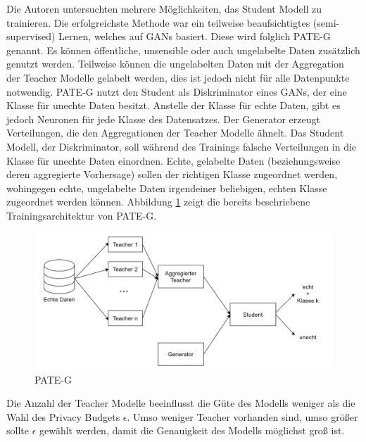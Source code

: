 Die Autoren untersuchten mehrere Möglichkeiten, das Student Modell zu trainieren.
Die erfolgreichste Methode war ein teilweise beaufsichtigtes (semi-supervised) Lernen, welches auf GANs basiert.
Diese wird folglich PATE-G genannt.
Es können öffentliche, unsensible oder auch ungelabelte Daten zusätzlich genutzt werden.
Teilweise können die ungelabelten Daten mit der Aggregation der Teacher Modelle gelabelt werden, dies ist jedoch nicht für alle Datenpunkte notwendig.
PATE-G nutzt den Student als Diskriminator eines GANs, der eine Klasse für unechte Daten besitzt. 
Anstelle der Klasse für echte Daten, gibt es jedoch Neuronen für jede Klasse des Datensatzes.
Der Generator erzeugt Verteilungen, die den Aggregationen der Teacher Modelle ähnelt.
Das Student Modell, der Diskriminator, soll während des Trainings falsche Verteilungen in die Klasse für unechte Daten einordnen.
Echte, gelabelte Daten (beziehungsweise deren aggregierte Vorhersage) sollen der richtigen Klasse zugeordnet werden, wohingegen echte, ungelabelte Daten irgendeiner beliebigen, echten Klasse zugeordnet werden können.
Abbildung \ref{fig:pate_g} zeigt die bereits beschriebene Trainingsarchitektur von PATE-G.

\begin{figure}[!htb]
    \centering
    \includegraphics[width=15cm]{figures/pate_g.png}
    \caption{PATE-G}
    \label{fig:pate_g}
\end{figure} 

Die Anzahl der Teacher Modelle beeinflusst die Güte des Modells weniger als die Wahl des Privacy Budgets $\epsilon$.
Umso weniger Teacher vorhanden sind, umso größer sollte $\epsilon$ gewählt werden, damit die Genauigkeit des Modells möglichst groß ist.



